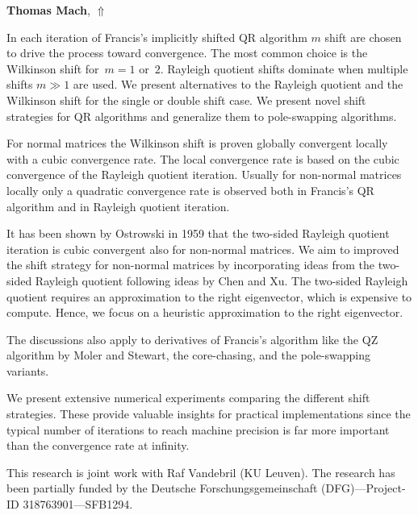 \documentclass[ILAS2025-program.tex]{subfiles}
\begin{document}
\hypertarget{down0410}{}\begin{ilasabstract}
    
\textbf{Thomas Mach},  \hfill \hyperlink{up0410}{$\Uparrow$}
    
    
\mtskip
    In each iteration of Francis's implicitly shifted QR algorithm $m$ shift are
chosen to drive the process toward convergence. The most common choice is the
Wilkinson shift for~$m=1$ or~$2$. Rayleigh quotient shifts dominate when
multiple shifts $m\gg 1$ are used. We present alternatives to the Rayleigh
quotient and the Wilkinson shift for the single or double shift case. We present
novel shift strategies for QR algorithms and generalize them to pole-swapping
algorithms.

For normal matrices the Wilkinson shift is proven globally convergent locally
with a cubic convergence rate. The local convergence rate is based on the cubic
convergence of the Rayleigh quotient iteration. Usually for non-normal matrices
locally only a quadratic convergence rate is observed both in Francis's QR
algorithm and in Rayleigh quotient iteration.

It has been shown by Ostrowski in 1959 that the two-sided Rayleigh quotient
iteration is cubic convergent also for non-normal matrices.  We aim to improved
the shift strategy for non-normal matrices by incorporating ideas from the
two-sided Rayleigh quotient following ideas by Chen and Xu. The two-sided
Rayleigh quotient requires an approximation to the right eigenvector, which is
expensive to compute. Hence, we focus on a heuristic approximation to the right
eigenvector.

The discussions also apply to derivatives of Francis's algorithm like the QZ
algorithm by Moler and Stewart, the core-chasing, and the pole-swapping
variants.

We present extensive numerical experiments comparing the different shift
strategies. These provide valuable insights for practical implementations since
the typical number of iterations to reach machine precision is far more
important than the convergence rate at infinity.

This research is joint work with Raf Vandebril (KU Leuven). The research has
been partially funded by the Deutsche Forschungsgemeinschaft (DFG)---Project-ID
318763901---SFB1294.


\end{ilasabstract}
    
\end{document}
